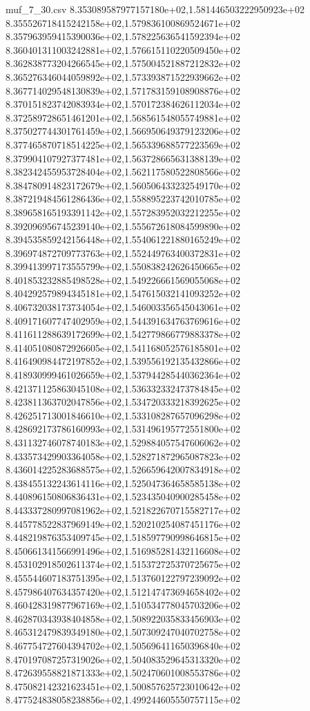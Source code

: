 \begin{filecontents*}{muf_7_30.csv}
8.353089587977157180e+02,1.581446503222950923e+02
8.355526718415242158e+02,1.579836100869524671e+02
8.357963959415390036e+02,1.578225636541592394e+02
8.360401311003242881e+02,1.576615110220509450e+02
8.362838773204266545e+02,1.575004521887212832e+02
8.365276346044059892e+02,1.573393871522939662e+02
8.367714029548130839e+02,1.571783159108908876e+02
8.370151823742083934e+02,1.570172384626112034e+02
8.372589728651461201e+02,1.568561548055749881e+02
8.375027744301761459e+02,1.566950649379123206e+02
8.377465870718514225e+02,1.565339688577223569e+02
8.379904107927377481e+02,1.563728665631388139e+02
8.382342455953728404e+02,1.562117580522808566e+02
8.384780914823172679e+02,1.560506433232549170e+02
8.387219484561286436e+02,1.558895223742010785e+02
8.389658165193391142e+02,1.557283952032212255e+02
8.392096956745239140e+02,1.555672618084599890e+02
8.394535859242156448e+02,1.554061221880165249e+02
8.396974872709773763e+02,1.552449763400372831e+02
8.399413997173555799e+02,1.550838242626450665e+02
8.401853232885498528e+02,1.549226661569055068e+02
8.404292579894345181e+02,1.547615032141093252e+02
8.406732038173734054e+02,1.546003356545043061e+02
8.409171607747402959e+02,1.544391634763769616e+02
8.411611288639172699e+02,1.542779866779883378e+02
8.414051080872926605e+02,1.541168052576185801e+02
8.416490984472197852e+02,1.539556192135432866e+02
8.418930999461026659e+02,1.537944285440362364e+02
8.421371125863045108e+02,1.536332332473784845e+02
8.423811363702047856e+02,1.534720333218392625e+02
8.426251713001846610e+02,1.533108287657096298e+02
8.428692173786160993e+02,1.531496195772551800e+02
8.431132746078740183e+02,1.529884057547606062e+02
8.433573429903364058e+02,1.528271872965087823e+02
8.436014225283688575e+02,1.526659642007834918e+02
8.438455132243614116e+02,1.525047364658585138e+02
8.440896150806836431e+02,1.523435040900285458e+02
8.443337280997081962e+02,1.521822670715582717e+02
8.445778522837969149e+02,1.520210254087451176e+02
8.448219876353409745e+02,1.518597790998646815e+02
8.450661341566991496e+02,1.516985281432116608e+02
8.453102918502611374e+02,1.515372725370725675e+02
8.455544607183751395e+02,1.513760122797239092e+02
8.457986407634357420e+02,1.512147473694658402e+02
8.460428319877967169e+02,1.510534778045703206e+02
8.462870343938404858e+02,1.508922035833456903e+02
8.465312479839349180e+02,1.507309247040702758e+02
8.467754727604394702e+02,1.505696411650396840e+02
8.470197087257319026e+02,1.504083529645313320e+02
8.472639558821871333e+02,1.502470601008553786e+02
8.475082142321623451e+02,1.500857625723010642e+02
8.477524838058238856e+02,1.499244605550757115e+02

\end{filecontents*}
